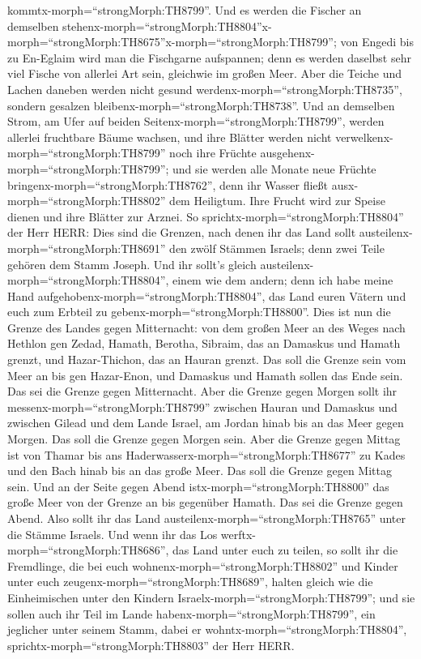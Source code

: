 kommtx-morph=``strongMorph:TH8799''.  Und es werden die
Fischer an demselben
stehenx-morph=``strongMorph:TH8804''\textbar x-morph=``strongMorph:TH8675''x-morph=``strongMorph:TH8799'';
von Engedi bis zu En-Eglaim wird man die Fischgarne aufspannen; denn es
werden daselbst sehr viel Fische von allerlei Art sein, gleichwie im
großen Meer.  Aber die Teiche und Lachen daneben werden
nicht gesund werdenx-morph=``strongMorph:TH8735'', sondern gesalzen
bleibenx-morph=``strongMorph:TH8738''.  Und an demselben
Strom, am Ufer auf beiden Seitenx-morph=``strongMorph:TH8799'', werden
allerlei fruchtbare Bäume wachsen, und ihre Blätter werden nicht
verwelkenx-morph=``strongMorph:TH8799'' noch ihre Früchte
ausgehenx-morph=``strongMorph:TH8799''; und sie werden alle Monate neue
Früchte bringenx-morph=``strongMorph:TH8762'', denn ihr Wasser fließt
ausx-morph=``strongMorph:TH8802'' dem Heiligtum. Ihre Frucht wird zur
Speise dienen und ihre Blätter zur Arznei.  So
sprichtx-morph=``strongMorph:TH8804'' der Herr HERR: Dies sind die
Grenzen, nach denen ihr das Land sollt
austeilenx-morph=``strongMorph:TH8691'' den zwölf Stämmen Israels; denn
zwei Teile gehören dem Stamm Joseph.  Und ihr sollt's
gleich austeilenx-morph=``strongMorph:TH8804'', einem wie dem andern;
denn ich habe meine Hand aufgehobenx-morph=``strongMorph:TH8804'', das
Land euren Vätern und euch zum Erbteil zu
gebenx-morph=``strongMorph:TH8800''.  Dies ist nun die
Grenze des Landes gegen Mitternacht: von dem großen Meer an des Weges
nach Hethlon gen Zedad,  Hamath, Berotha, Sibraim, das an
Damaskus und Hamath grenzt, und Hazar-Thichon, das an Hauran grenzt.
 Das soll die Grenze sein vom Meer an bis gen Hazar-Enon,
und Damaskus und Hamath sollen das Ende sein. Das sei die Grenze gegen
Mitternacht.  Aber die Grenze gegen Morgen sollt ihr
messenx-morph=``strongMorph:TH8799'' zwischen Hauran und Damaskus und
zwischen Gilead und dem Lande Israel, am Jordan hinab bis an das Meer
gegen Morgen. Das soll die Grenze gegen Morgen sein.  Aber
die Grenze gegen Mittag ist von Thamar bis ans
Haderwasserx-morph=``strongMorph:TH8677'' zu Kades und den Bach hinab
bis an das große Meer. Das soll die Grenze gegen Mittag sein.
 Und an der Seite gegen Abend
istx-morph=``strongMorph:TH8800'' das große Meer von der Grenze an bis
gegenüber Hamath. Das sei die Grenze gegen Abend.  Also
sollt ihr das Land austeilenx-morph=``strongMorph:TH8765'' unter die
Stämme Israels.  Und wenn ihr das Los
werftx-morph=``strongMorph:TH8686'', das Land unter euch zu teilen, so
sollt ihr die Fremdlinge, die bei euch
wohnenx-morph=``strongMorph:TH8802'' und Kinder unter euch
zeugenx-morph=``strongMorph:TH8689'', halten gleich wie die
Einheimischen unter den Kindern Israelx-morph=``strongMorph:TH8799'';
 und sie sollen auch ihr Teil im Lande
habenx-morph=``strongMorph:TH8799'', ein jeglicher unter seinem Stamm,
dabei er wohntx-morph=``strongMorph:TH8804'',
sprichtx-morph=``strongMorph:TH8803'' der Herr HERR.

